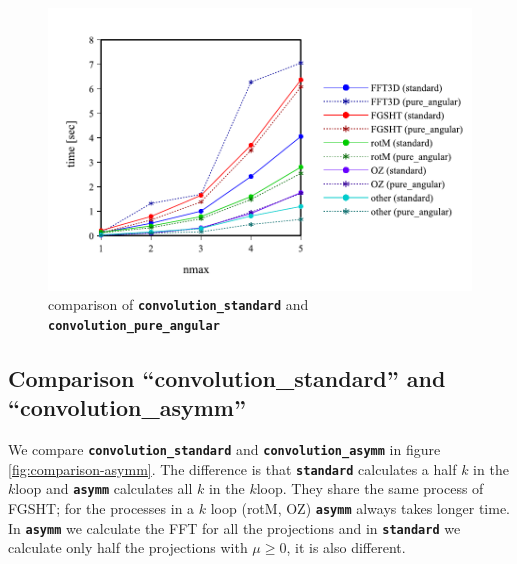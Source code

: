 \begin{figure}[H]
\begin{centering}
\includegraphics[bb=0bp 20bp 432bp 268bp,scale=0.6]{_figure/results/pure_angular}
\par\end{centering}
\caption{comparison of \texttt{\textbf{convolution\_standard}} and \texttt{\textbf{convolution\_pure\_angular\label{fig:comparison-pure_angular}}}}
\end{figure}


\subsection{Comparison ``convolution\_standard'' and ``convolution\_asymm''}

We compare \texttt{\textbf{convolution\_standard}} and \texttt{\textbf{convolution\_asymm}}
 in figure \ref{fig:comparison-asymm}. The difference is
that \texttt{\textbf{standard}} calculates a half $k$ in the $k$loop
and \texttt{\textbf{asymm}} calculates all $k$ in the $k$loop. They
share the same process of FGSHT; for the processes in a $k$ loop
(rotM, OZ) \texttt{\textbf{asymm}} always takes longer time. In
\texttt{\textbf{asymm}} we calculate the FFT for all the projections
and in \texttt{\textbf{standard}} we calculate only half the projections
with $\mu\geq0$, it is also different. %

